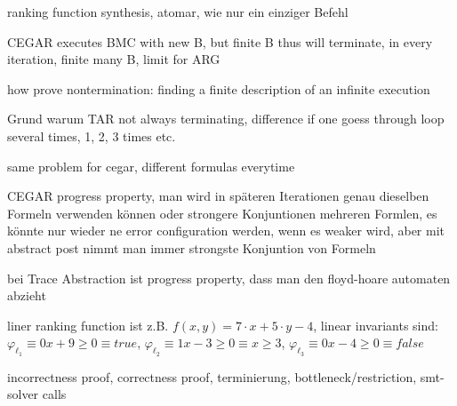 \documentclass[landscape, a4paper]{article}
\begin{document}
\begin{minipage}[t]{0.2\linewidth}
\begin{betterlist}
		\item ranking function synthesis, atomar, wie nur ein einziger Befehl
		\item CEGAR executes BMC with new B, but finite B thus will terminate, in every iteration, finite many B, limit for ARG
		\item how prove nontermination: finding a finite description of an infinite execution
		\item Grund warum TAR not always terminating, difference if one goess through loop several times, 1, 2, 3 times etc.
		\begin{betterlist}
			\item same problem for cegar, different formulas everytime
		\end{betterlist}
		\item CEGAR progress property, man wird in späteren Iterationen genau dieselben Formeln verwenden können oder strongere Konjuntionen mehreren Formlen, es könnte nur wieder ne error configuration werden, wenn es weaker wird, aber mit abstract post nimmt man immer strongste Konjuntion von Formeln
		\item bei Trace Abstraction ist progress property, dass man den floyd-hoare automaten abzieht
		\item liner ranking function ist z.B. $f(x, y) = 7\cdot x + 5\cdot y −4$, linear invariants sind: $\varphi_{\ell_1} \equiv 0x + 9 \geq 0\equiv true$, $\varphi_{\ell_2} \equiv 1x −3 \geq 0 \equiv x \geq 3$, $ \varphi_{\ell_3} \equiv 0x −4 \geq 0 \equiv false$
		\item incorrectness proof, correctness proof, terminierung, bottleneck/restriction, smt-solver calls
	\end{betterlist}
\end{minipage}
\begin{minipage}[t]{0.2\linewidth}
\end{minipage}
\begin{minipage}[t]{0.2\linewidth}
\end{minipage}
\end{document}
